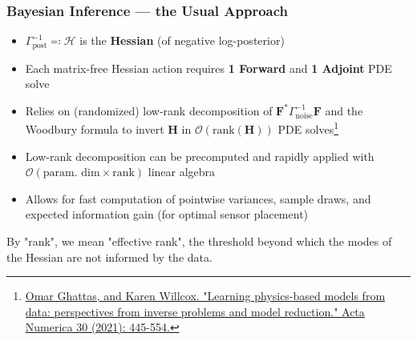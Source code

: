 \begin{frame}
    \frametitle{Bayesian Inference — the Usual Approach}
    \begin{itemize}
        \item \(\Gamma_{\!\text{post}}^{-1} \eqqcolon \mathcal{H}\) is the \textbf{Hessian} (of negative log-posterior)
        \item Each matrix-free Hessian action requires \textbf{1 Forward} and \textbf{1 Adjoint} PDE solve
        \item Relies on (randomized) low-rank decomposition of \(\mathbf{F}^* \Gamma_{\!\text{noise}}^{-1} \mathbf{F}\) and the Woodbury formula to invert \(\mathbf{H}\) in \(\mathcal{O}(\text{rank}(\mathbf{H}))\) PDE solves\footnote{\href{https://www.cambridge.org/core/journals/acta-numerica/article/learning-physicsbased-models-from-data-perspectives-from-inverse-problems-and-model-reduction/C072A4B417F8C3873ED75C1D63BBB31D}{Omar Ghattas, and Karen Willcox. "Learning physics-based models from data: perspectives from inverse problems and model reduction." Acta Numerica 30 (2021): 445-554.}}
        \item Low-rank decomposition can be precomputed and rapidly applied with \(\mathcal{O}(\text{param. dim} \times \text{rank})\) linear algebra
        \item Allows for fast computation of pointwise variances, sample draws, and expected information gain (for optimal sensor placement)
    \end{itemize}
    \footnotesize{By "rank", we mean "effective rank", the threshold beyond which the modes of the Hessian are not informed by the data.}
\end{frame}


